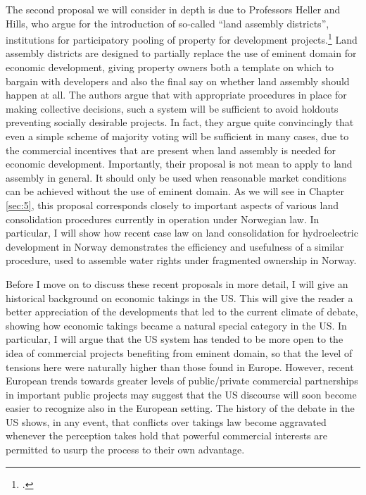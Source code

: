 The second proposal we will consider in depth is due to Professors Heller and Hills, who argue for the introduction of so-called ``land assembly districts'', institutions for participatory pooling of property for development projects.\footcite{heller08} Land assembly  districts are designed to partially replace the use of eminent domain for economic development, giving property owners both a template on which to bargain with developers and also the final say on whether land assembly should happen at all. The authors argue that with appropriate procedures in place for making collective decisions, such a system will be sufficient to avoid holdouts preventing socially desirable projects. In fact, they argue quite convincingly that even a simple scheme of majority voting will be sufficient in many cases, due to the commercial incentives that are present when land assembly is needed for economic development. Importantly, their proposal is not mean to apply to land assembly in general. It should only be used when reasonable market conditions can be achieved without the use of eminent domain. As we will see in Chapter \ref{sec:5}, this proposal corresponds closely to important aspects of various land consolidation procedures currently in operation under Norwegian law. In particular, I will show how recent case law on land consolidation for hydroelectric development in Norway demonstrates the efficiency and usefulness of a similar procedure, used to assemble water rights under fragmented ownership in Norway.

Before I move on to discuss these recent proposals in more detail, I will give an historical background on economic takings in the US. This will give the reader a better appreciation of the developments that led to the current climate of debate, showing how economic takings became a natural special category in the US. In particular, I will argue that the US system has tended to be more open to the idea of commercial projects benefiting from eminent domain, so that the level of tensions here were naturally higher than those found in Europe. However, recent European trends towards greater levels of public/private commercial partnerships in important public projects may suggest that the US discourse will soon become easier to recognize also in the European setting. The history of the debate in the US shows, in any event, that conflicts over takings law become aggravated whenever the perception takes hold that powerful commercial interests are permitted to usurp the process to their own advantage.

